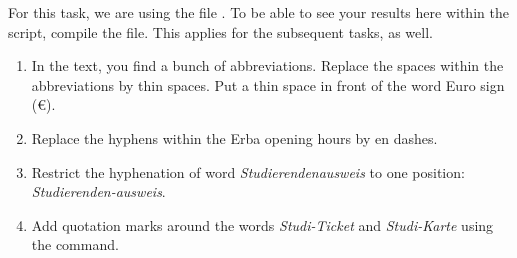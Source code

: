 For this task, we are using the file .
To be able to see your results here within the script,
compile the  file.
This applies for the subsequent tasks, as well.

\begin{enumerate}
	\item In the text, you find a bunch of abbreviations. Replace the spaces 
	within the abbreviations by thin spaces. Put a thin space in front of the 
	word Euro sign (€).
	\item Replace the hyphens within the Erba opening hours by en dashes.
	\item Restrict the hyphenation of word \emph{Studierendenausweis} to one position: \\\emph{Studierenden-ausweis}.
	\item Add quotation marks around the words \emph{Studi-Ticket} and 
	\emph{Studi-Karte} using the  command. 
\end{enumerate}


